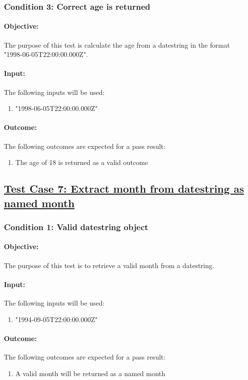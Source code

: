 \documentclass{article}
\begin{document}
\subsubsection{Condition 3: Correct age is returned  }
\paragraph{Objective:}  The purpose of this test is calculate the age from a datestring in the format "1998-06-05T22:00:00.000Z".
\paragraph{Input:} The following inputs will be used:
\begin{enumerate}
	\item "1998-06-05T22:00:00.000Z"
\end{enumerate}
\paragraph{Outcome:} The following outcomes are expected for a pass result:
\begin{enumerate}
	\item The age of 18 is returned as a valid outcome
\end{enumerate}


\subsection{\underline{Test Case 7: Extract month from datestring as named month}}\label{test7}
\subsubsection{Condition 1: Valid datestring object }
\paragraph{Objective:} The purpose of this test is to retrieve a valid month from a datestring.
\paragraph{Input:} The following inputs will be used:
\begin{enumerate}
	\item "1994-09-05T22:00:00.000Z"
\end{enumerate}
\paragraph{Outcome:} The following outcomes are expected for a pass result:
\begin{enumerate}
	\item A valid month will be returned as a named month
\end{enumerate}
\end{document}
